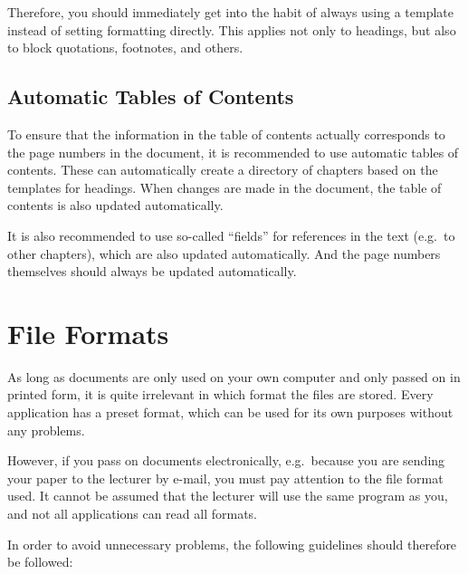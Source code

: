 \documentclass[
  english,
]{scrreprt}
\begin{document}
Therefore, you should immediately get into the habit of always using a template instead of setting formatting directly. This applies not only to headings, but also to block quotations, footnotes, and others.

\subsection{Automatic Tables of Contents}\label{automatic-tables-of-contents}

To ensure that the information in the table of contents actually corresponds to the page numbers in the document, it is recommended to use automatic tables of contents. These can automatically create a directory of chapters based on the templates for headings. When changes are made in the document, the table of contents is also updated automatically.

It is also recommended to use so-called “fields” for references in the text (e.g.~to other chapters), which are also updated automatically. And the page numbers themselves should always be updated automatically.

\section{File Formats}\label{sec:file_formats}

As long as documents are only used on your own computer and only passed on in printed form, it is quite irrelevant in which format the files are stored. Every application has a preset format, which can be used for its own purposes without any problems.

However, if you pass on documents electronically, e.g.~because you are sending your paper to the lecturer by e-mail, you must pay attention to the file format used. It cannot be assumed that the lecturer will use the same program as you, and not all applications can read all formats.

In order to avoid unnecessary problems, the following guidelines should therefore be followed:
\end{document}
